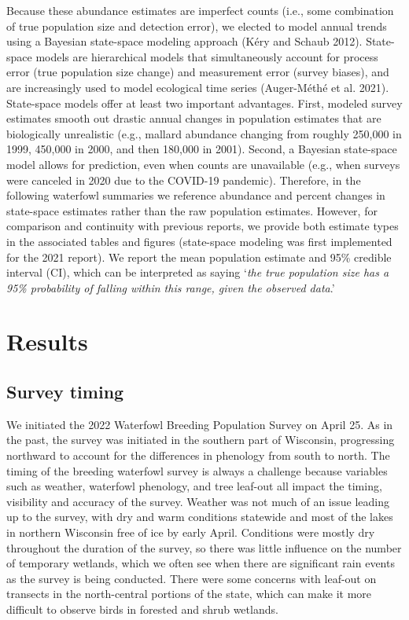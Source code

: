\documentclass[
  12pt,
]{article}
\begin{document}
Because these abundance estimates are imperfect counts (i.e., some
combination of true population size and detection error), we elected to
model annual trends using a Bayesian state-space modeling approach (Kéry
and Schaub 2012). State-space models are hierarchical models that
simultaneously account for process error (true population size change)
and measurement error (survey biases), and are increasingly used to
model ecological time series (Auger-Méthé et al. 2021). State-space
models offer at least two important advantages. First, modeled survey
estimates smooth out drastic annual changes in population estimates that
are biologically unrealistic (e.g., mallard abundance changing from
roughly 250,000 in 1999, 450,000 in 2000, and then 180,000 in 2001).
Second, a Bayesian state-space model allows for prediction, even when
counts are unavailable (e.g., when surveys were canceled in 2020 due to
the COVID-19 pandemic). Therefore, in the following waterfowl summaries
we reference abundance and percent changes in state-space estimates
rather than the raw population estimates. However, for comparison and
continuity with previous reports, we provide both estimate types in the
associated tables and figures (state-space modeling was first
implemented for the 2021 report). We report the mean population estimate
and 95\% credible interval (CI), which can be interpreted as saying
`\emph{the true population size has a 95\% probability of falling within
this range, given the observed data}.'

\hypertarget{results}{%
\section{Results}\label{results}}

\hypertarget{survey-timing}{%
\subsection{Survey timing}\label{survey-timing}}

We initiated the 2022 Waterfowl Breeding Population Survey on April 25.
As in the past, the survey was initiated in the southern part of
Wisconsin, progressing northward to account for the differences in
phenology from south to north. The timing of the breeding waterfowl
survey is always a challenge because variables such as weather,
waterfowl phenology, and tree leaf-out all impact the timing, visibility
and accuracy of the survey. Weather was not much of an issue leading up
to the survey, with dry and warm conditions statewide and most of the
lakes in northern Wisconsin free of ice by early April. Conditions were
mostly dry throughout the duration of the survey, so there was little
influence on the number of temporary wetlands, which we often see when
there are significant rain events as the survey is being conducted.
There were some concerns with leaf-out on transects in the north-central
portions of the state, which can make it more difficult to observe birds
in forested and shrub wetlands.
\end{document}
